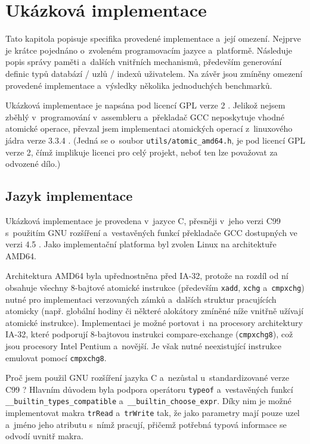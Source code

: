 \chapter{Ukázková implementace}

Tato kapitola popisuje specifika provedené implementace a~její omezení. Nejprve je
krátce pojednáno o~zvoleném programovacím jazyce a~platformě. Následuje popis
správy paměti a~dalších vnitřních mechanismů, především 
generování definic typů databází / uzlů
/ indexů uživatelem. Na závěr jsou zmíněny omezení provedené implementace
a~výsledky několika jednoduchých benchmarků.

Ukázková implementace je napsána
pod licencí GPL verze 2 \cite{GPLv2}. Jelikož nejsem zběhlý v~programování
v~assembleru a~překladač GCC neposkytuje vhodné atomické operace, převzal jsem
implementaci atomických operací z~linuxového jádra verze 3.3.4 \cite{linux3.3.4}.
(Jedná se o~soubor 
\verb|utils/atomic_amd64.h|, je pod licencí GPL verze 2, čímž implikuje
licenci pro celý projekt, neboť ten lze považovat za odvozené dílo.)



\section{Jazyk implementace}

Ukázková implementace je provedena v~jazyce C, přesněji v~jeho verzi C99 \cite{C99}
s~použitím
GNU rozšíření a~vestavěných funkcí překladače GCC dostupných ve verzi 4.5
\cite{gccGNUexts}. Jako implementační platforma
byl zvolen Linux na architektuře AMD64.

Architektura AMD64
byla upřednostněna před IA-32,
protože na rozdíl od ní obsahuje všechny 8-bajtové
atomické instrukce (především \verb|xadd|, \verb|xchg| a~\verb|cmpxchg|)
nutné pro implementaci
verzovaných zámků a~dalších struktur pracujících atomicky (např. globální
hodiny či některé alokátory zmíněné níže vnitřně užívají atomické instrukce).
Implementaci je možné portovat i~na procesory architektury IA-32, které
podporují 8-bajtovou instrukci compare-exchange (\verb|cmpxchg8|), což jsou procesory
Intel Pentium a~novější. Je však nutné neexistující instrukce emulovat pomocí
\verb|cmpxchg8|.

Proč jsem použil GNU rozšíření jazyka C a~nezůstal u~standardizované verze C99 \cite{C99}?
Hlavním důvodem byla podpora operátoru \verb|typeof| a~vestavěných funkcí
\verb|__builtin_types_compatible| a~\verb|__builtin_choose_expr|. Díky nim je
možné implementovat makra \verb|trRead| a~\verb|trWrite| tak, že jako
parametry mají pouze uzel a~jméno jeho atributu s~nímž pracují, přičemž potřebná
typová informace se odvodí uvnitř makra.


